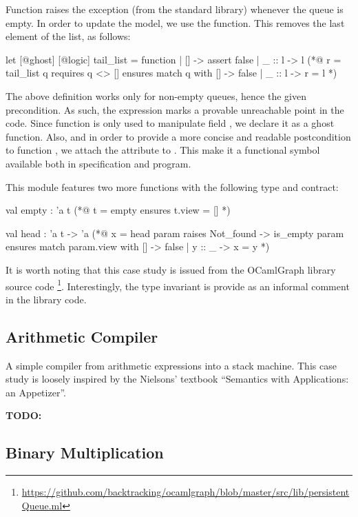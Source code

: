 \documentclass{llncs}
\newcommand{\todo}[1]{\textbf{TODO:}#1}
\begin{document}
Function  raises the  exception (from the \ocaml standard
library) whenever the queue is empty. In order to update the  model, we
use the  function. This removes the last element of the 
list, as follows:
%
\begin{gospel}
  let [@ghost] [@logic] tail_list = function
    | [] -> assert false
    | _ :: l -> l
  (*@ r = tail_list q
        requires q <> []
        ensures  match q with [] -> false | _ :: l -> r = l *)
\end{gospel}
%
The above definition works only for non-empty queues, hence the given
precondition. As such, the  expression marks a provable
unreachable point in the code. Since function  is only used to
manipulate field , we declare it as a ghost function. Also, and in
order to provide a more concise and readable postcondition to function
, we attach the \of{[@logic]} attribute to . This make it
a functional symbol available both in specification and program.

This \ocaml module features two more functions with the following type and
contract:
%
\begin{gospel}
  val empty : 'a t
  (*@ t = empty
        ensures t.view = [] *)

  val head : 'a t -> 'a
  (*@ x = head param
        raises  Not_found -> is_empty param
        ensures match param.view with [] -> false | y :: _ -> x = y *)
\end{gospel}
%
It is worth noting that this case study is issued from the OCamlGraph library
source code
\footnote{\scriptsize\url{https://github.com/backtracking/ocamlgraph/blob/master/src/lib/persistentQueue.ml}}.
Interestingly, the type invariant is provide as an informal comment in the
library code.

\subsection{Arithmetic Compiler}
\label{sec:arithmetic-compiler}

A simple compiler from arithmetic expressions into a stack machine. This case
study is loosely inspired by the Nielsons' textbook ``Semantics with
Applications: an Appetizer''.

\todo

\subsection{Binary Multiplication}
\label{sec:binary-mult}
\end{document}
